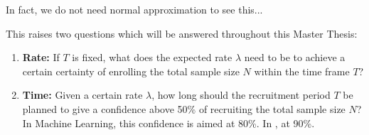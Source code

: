 In fact, we do not need normal approximation to see this...

This raises two questions which will be answered throughout this Master Thesis:
\begin{enumerate}
\item \textbf{Rate:} If $T$ is fixed, what does the expected rate $\lambda$ need to be to achieve a certain certainty of enrolling the total sample size $N$ within the time frame $T$?
\item \textbf{Time:} Given a certain rate $\lambda$, how long should the recruitment period $T$ be planned to give a confidence above 50\% of recruiting the total sample size $N$? In Machine Learning, this confidence is aimed at 80\%. In \cite{carter2004application}, at 90\%.
\end{enumerate}
